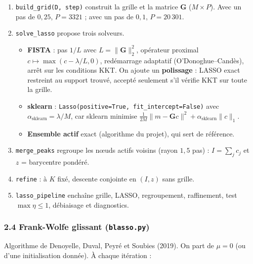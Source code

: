 \documentclass[
  french,
]{article}
\providecommand{\tightlist}{%
  \setlength{\itemsep}{0pt}\setlength{\parskip}{0pt}}
\begin{document}
\begin{enumerate}
\def\labelenumi{\arabic{enumi}.}
\tightlist
\item
  \texttt{build\_grid(D,\ step)} construit la grille et la matrice
  \(\mathbf{G}\) (\(M\times P\)). Avec un pas de \(0{,}25\),
  \(P = 3321\) ; avec un pas de \(0{,}1\), \(P = 20\,301\).
\item
  \texttt{solve\_lasso} propose trois solveurs.

  \begin{itemize}
  \tightlist
  \item
    \textbf{FISTA} : pas \(1/L\) avec
    \(L = \lVert\mathbf{G}\rVert_2^2\), opérateur proximal
    \(c\mapsto\max(c-\lambda/L, 0)\), redémarrage adaptatif
    (O'Donoghue--Candès), arrêt sur les conditions KKT. On ajoute un
    \textbf{polissage} : LASSO exact restreint au support trouvé,
    accepté seulement s'il vérifie KKT sur toute la grille.
  \item
    \textbf{sklearn} :
    \texttt{Lasso(positive=True,\ fit\_intercept=False)} avec
    \(\alpha_{\mathrm{sklearn}} = \lambda/M\), car sklearn minimise
    \(\frac{1}{2M}\lVert m-\mathbf{G}c\rVert^2 + \alpha_{\mathrm{sklearn}}\lVert c\rVert_1\).
  \item
    \textbf{Ensemble actif} exact (algorithme du projet), qui sert de
    référence.
  \end{itemize}
\item
  \texttt{merge\_peaks} regroupe les nœuds actifs voisins (rayon
  \(1{,}5\) pas) : \(I = \sum_j c_j\) et \(z\) = barycentre pondéré.
\item
  \texttt{refine} : à \(K\) fixé, descente conjointe en \((I, z)\) sans
  grille.
\item
  \texttt{lasso\_pipeline} enchaîne grille, LASSO, regroupement,
  raffinement, test \(\max\eta\le 1\), débiaisage et diagnostics.
\end{enumerate}

\subsubsection{\texorpdfstring{2.4 Frank-Wolfe glissant
(\texttt{blasso.py})}{2.4 Frank-Wolfe glissant (blasso.py)}}\label{frank-wolfe-glissant-blasso.py}

Algorithme de Denoyelle, Duval, Peyré et Soubies (2019). On part de
\(\mu = 0\) (ou d'une initialisation donnée). À chaque itération :
\end{document}
